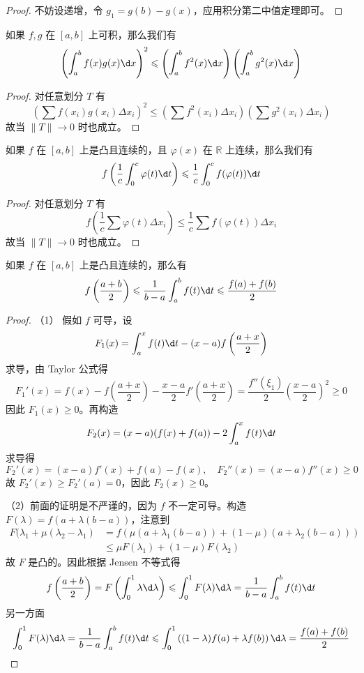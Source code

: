 \begin{proof}
	不妨设递增，令 $g_1 = g(b) - g(x)$，应用积分第二中值定理即可。
\end{proof}

\begin{theorem}
	如果 $f, g$ 在 $[a, b]$ 上可积，那么我们有
	\[ \left(\int_{a}^{b} f(x) g(x) \d x \right)^2 \leqslant \left(\int_{a}^{b} f^2(x)\d x \right)\left(\int_{a}^{b} g^2(x) \d x\right) \]
\end{theorem}
\begin{proof}
	对任意划分 $T$ 有
	\[ \left(\sum f(x_i) g(x_i) \Delta x_i\right)^2 \leqslant \left(\sum f^2(x_i) \Delta x_i\right)\left(\sum g^2(x_i) \Delta x_i\right) \]
	故当 $\|T\| \to 0$ 时也成立。
\end{proof}

\begin{theorem}
	如果 $f$ 在 $[a, b]$ 上是凸且连续的，且 $\varphi(x)$ 在 $\mathbb{R}$ 上连续，那么我们有
	\[ f\left(\frac{1}{c} \int_{0}^{c} \varphi(t) \d t \right) \leqslant \frac{1}{c} \int_{0}^{c} f(\varphi(t))\d t \]
\end{theorem}
\begin{proof}
	对任意划分 $T$ 有
	\[ f\left(\frac{1}{c} \sum \varphi(t) \Delta x_i \right) \leqslant \frac{1}{c} \sum f(\varphi(t))\Delta x_i \]
	故当 $\|T\| \to 0$ 时也成立。
\end{proof}

\begin{theorem}
	如果 $f$ 在 $[a, b]$ 上是凸且连续的，那么有
	\[ f\left(\frac{a+b}{2}\right) \leqslant \frac{1}{b - a} \int_{a}^{b} f(t) \d t \leqslant \frac{f(a) + f(b)}{2} \]
\end{theorem}

\begin{proof}
	（1） 假如 $f$ 可导，设
	\[ F_1(x) = \int_{a}^{x} f(t) \d t - (x-a)f\left(\frac{a+x}{2}\right) \]
	求导，由 Taylor 公式得
	\[ F_1'(x) = f(x) - f\left(\frac{a+x}{2}\right) - \frac{x-a}{2}f'\left(\frac{a+x}{2}\right) = \frac{f''(\xi_1)}{2} \left(\frac{x-a}{2}\right)^2 \geqslant 0 \]
	因此 $F_1(x) \geqslant 0$。再构造
	\[ F_2(x) = (x - a)(f(x) + f(a)) - 2 \int_{a}^{x} f(t) \d t \]
	求导得
	\[ F_2'(x) = (x-a) f'(x) + f(a) - f(x), \quad F_2''(x) = (x-a)f''(x) \geqslant 0 \]
	故 $F_2'(x) \geqslant F_2'(a) = 0$，因此 $F_2(x) \geqslant 0$。

	（2）前面的证明是不严谨的，因为 $f$ 不一定可导。构造 $F(\lambda) = f(a + \lambda(b - a))$，注意到
	\[ \begin{aligned}
			F(\lambda_1 + \mu(\lambda_2 - \lambda_1)
			 & = f(\mu(a + \lambda_1(b-a)) + (1 - \mu)(a + \lambda_2(b-a))) \\
			 & \leqslant \mu F(\lambda_1) + (1 - \mu) F(\lambda_2)
		\end{aligned}  \]
	故 $F$ 是凸的。因此根据 Jensen 不等式得
	\[ f\left(\frac{a+b}{2}\right) = F\left(\int_{0}^{1} \lambda \d \lambda \right) \leqslant \int_{0}^{1} F(\lambda) \d \lambda = \frac{1}{b-a}\int_{a}^{b} f(t) \d t \]
	另一方面
	\[ \int_{0}^{1} F(\lambda) \d \lambda = \frac{1}{b-a}\int_{a}^{b} f(t) \d t \leqslant \int_{0}^{1} \left((1 - \lambda)f(a) + \lambda f(b)\right) \d \lambda = \frac{f(a) + f(b)}{2} \]
\end{proof}

